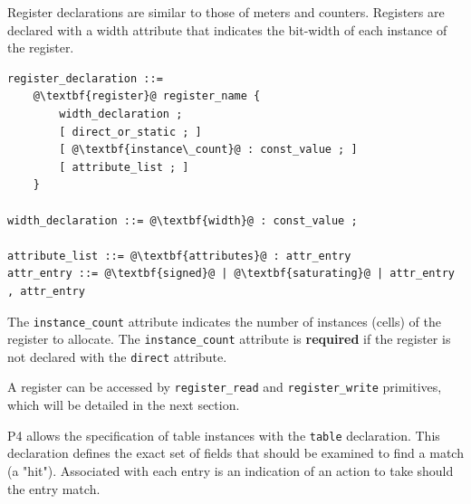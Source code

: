 \documentclass[12pt]{article}
\begin{document}
Register declarations are similar to those of meters and
counters. Registers are declared with a width
attribute that indicates the bit-width of each instance of
the register.

\begin{lstlisting}[frame=single,backgroundcolor=\color{bnfgreen},escapechar=\@]
register_declaration ::= 
    @\textbf{register}@ register_name {
        width_declaration ;
        [ direct_or_static ; ]
        [ @\textbf{instance\_count}@ : const_value ; ]
        [ attribute_list ; ]
    }

width_declaration ::= @\textbf{width}@ : const_value ;

attribute_list ::= @\textbf{attributes}@ : attr_entry
attr_entry ::= @\textbf{signed}@ | @\textbf{saturating}@ | attr_entry , attr_entry
\end{lstlisting}


The \texttt{instance_count} attribute indicates the number of 
instances (cells) of the register to allocate. The 
\texttt{instance_count} attribute is \textbf{required} if the 
register is not declared with the \texttt{direct} attribute.

%
%
%
%

A register can be accessed by \texttt{register_read} and 
\texttt{register_write} primitives, which will be detailed in the 
next section.


P4 allows the specification of table instances with the \texttt{table}
declaration. This declaration defines the exact set of fields that
should be examined to find a match (a "hit").  Associated with each
entry is an indication of an action to take should the entry match.
\end{document}
